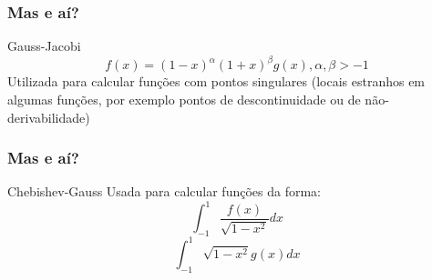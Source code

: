 \documentclass{beamer}
\begin{document}
\begin{frame}
\frametitle{Mas e aí?}
Gauss-Jacobi
    $$ f(x) = (1 - x)^\alpha (1+x)^\beta g(x), \alpha, \beta > -1$$
    Utilizada para calcular funções com pontos singulares (locais estranhos em algumas funções, por exemplo pontos de descontinuidade ou de não-derivabilidade)
\end{frame}
\begin{frame}
\frametitle{Mas e aí?}
Chebishev-Gauss
    Usada para calcular funções da forma:
    $$\int_{-1}^1 {\dfrac{f(x)}{\sqrt{1-x^2}} dx}$$
    $$\int_{-1}^1 {\sqrt{1-x^2} g(x) } dx$$
\end{frame}


%
%
%
%
%
%
					
\end{document}
